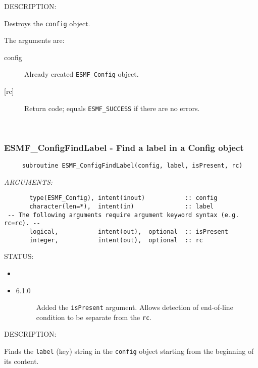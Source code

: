 {\sf DESCRIPTION:\\ }

 
      Destroys the {\tt config} object.
  
     The arguments are:
     \begin{description}
     \item [config]
       Already created {\tt ESMF\_Config} object.
     \item [{[rc]}]
       Return code; equals {\tt ESMF\_SUCCESS} if there are no errors.
     \end{description}
   
 
\mbox{}\hrulefill\ 
 

  \subsubsection [ESMF\_ConfigFindLabel] {ESMF\_ConfigFindLabel - Find a label in a Config object}


  
\begin{verbatim}     subroutine ESMF_ConfigFindLabel(config, label, isPresent, rc)
 \end{verbatim}{\em ARGUMENTS:}
\begin{verbatim}       type(ESMF_Config), intent(inout)           :: config 
       character(len=*),  intent(in)              :: label
 -- The following arguments require argument keyword syntax (e.g. rc=rc). --
       logical,           intent(out),  optional  :: isPresent
       integer,           intent(out),  optional  :: rc 
 \end{verbatim}
{\sf STATUS:}
   \begin{itemize}
   \item{}
   \item{}
   \begin{description}
   \item[6.1.0] Added the {\tt isPresent} argument.  Allows detection of
    end-of-line condition to be separate from the {\tt rc}.
   \end{description}
   \end{itemize}
  
{\sf DESCRIPTION:\\ }

Finds the {\tt label} (key) string in the {\tt config} object 
     starting from the beginning of its content.
  

